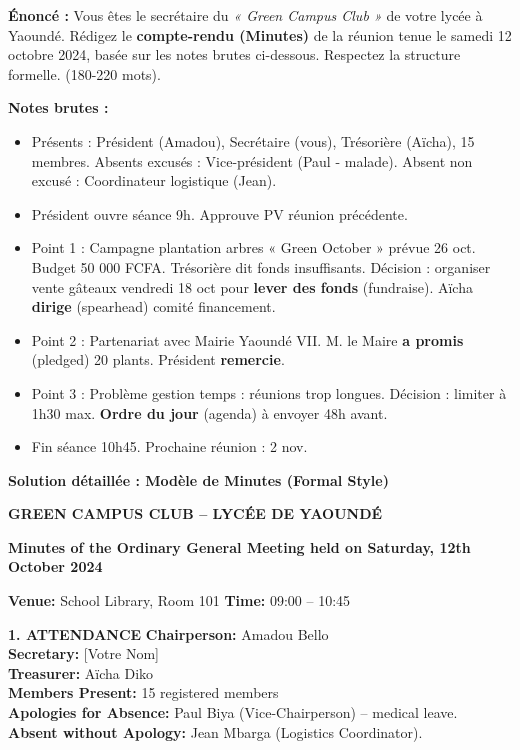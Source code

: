 \documentclass[11pt]{article}
\begin{document}
\begin{exoresolu}
\textbf{Énoncé :} Vous êtes le secrétaire du \textit{« Green Campus Club »} de votre lycée à Yaoundé. Rédigez le \textbf{compte-rendu (Minutes)} de la réunion tenue le samedi 12 octobre 2024, basée sur les notes brutes ci-dessous. Respectez la structure formelle. (180-220 mots).

\textbf{Notes brutes :}
\begin{itemize}
    \item Présents : Président (Amadou), Secrétaire (vous), Trésorière (Aïcha), 15 membres. Absents excusés : Vice-président (Paul - malade). Absent non excusé : Coordinateur logistique (Jean).
    \item Président ouvre séance 9h. Approuve PV réunion précédente.
    \item Point 1 : Campagne plantation arbres « Green October » prévue 26 oct. Budget 50 000 FCFA. Trésorière dit fonds insuffisants. Décision : organiser vente gâteaux vendredi 18 oct pour \textbf{lever des fonds} (fundraise). Aïcha \textbf{dirige} (spearhead) comité financement.
    \item Point 2 : Partenariat avec Mairie Yaoundé VII. M. le Maire \textbf{a promis} (pledged) 20 plants. Président \textbf{remercie}.
    \item Point 3 : Problème gestion temps : réunions trop longues. Décision : limiter à 1h30 max. \textbf{Ordre du jour} (agenda) à envoyer 48h avant.
    \item Fin séance 10h45. Prochaine réunion : 2 nov.
\end{itemize}

\tcblower

\textbf{Solution détaillée : Modèle de Minutes (Formal Style)}

\begin{textebox}
\textbf{GREEN CAMPUS CLUB -- LYCÉE DE YAOUNDÉ}

\textbf{Minutes of the Ordinary General Meeting held on Saturday, 12th October 2024}

\textbf{Venue:} School Library, Room 101 \hfill \textbf{Time:} 09:00 -- 10:45

\textbf{1. ATTENDANCE}
\textbf{Chairperson:} Amadou Bello \\
\textbf{Secretary:} [Votre Nom] \\
\textbf{Treasurer:} Aïcha Diko \\
\textbf{Members Present:} 15 registered members \\
\textbf{Apologies for Absence:} Paul Biya (Vice-Chairperson) -- medical leave. \\
\textbf{Absent without Apology:} Jean Mbarga (Logistics Coordinator).


\end{textebox}
\end{exoresolu}
\end{document}
